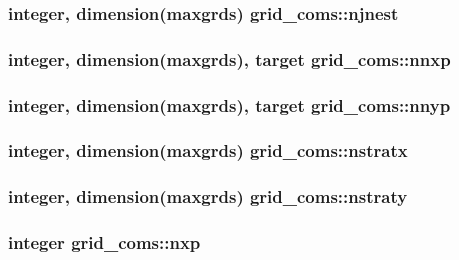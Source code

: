 \subsubsection[{njnest}]{\setlength{\rightskip}{0pt plus 5cm}integer, dimension(maxgrds) grid\+\_\+coms\+::njnest}\label{namespacegrid__coms_a98e39448e926de9a2fa2de1ad700e7ae}
\hypertarget{namespacegrid__coms_a94ce46153415e535023e58d322bcaa98}{}
\subsubsection[{nnxp}]{\setlength{\rightskip}{0pt plus 5cm}integer, dimension(maxgrds), target grid\+\_\+coms\+::nnxp}\label{namespacegrid__coms_a94ce46153415e535023e58d322bcaa98}
\hypertarget{namespacegrid__coms_a5776874c241f87f4651671b401170756}{}
\subsubsection[{nnyp}]{\setlength{\rightskip}{0pt plus 5cm}integer, dimension(maxgrds), target grid\+\_\+coms\+::nnyp}\label{namespacegrid__coms_a5776874c241f87f4651671b401170756}
\hypertarget{namespacegrid__coms_a319d9e19581f63cae8b605b8c8a6ab85}{}
\subsubsection[{nstratx}]{\setlength{\rightskip}{0pt plus 5cm}integer, dimension(maxgrds) grid\+\_\+coms\+::nstratx}\label{namespacegrid__coms_a319d9e19581f63cae8b605b8c8a6ab85}
\hypertarget{namespacegrid__coms_a2886e23677c5f71657725bda33ccaba8}{}
\subsubsection[{nstraty}]{\setlength{\rightskip}{0pt plus 5cm}integer, dimension(maxgrds) grid\+\_\+coms\+::nstraty}\label{namespacegrid__coms_a2886e23677c5f71657725bda33ccaba8}
\hypertarget{namespacegrid__coms_aff2c702052cc543c317c4feea0dbb76a}{}
\subsubsection[{nxp}]{\setlength{\rightskip}{0pt plus 5cm}integer grid\+\_\+coms\+::nxp}\label{namespacegrid__coms_aff2c702052cc543c317c4feea0dbb76a}
\hypertarget{namespacegrid__coms_a3a74d4b8ff65bb4d8f8eb2f22a91c68d}{}
